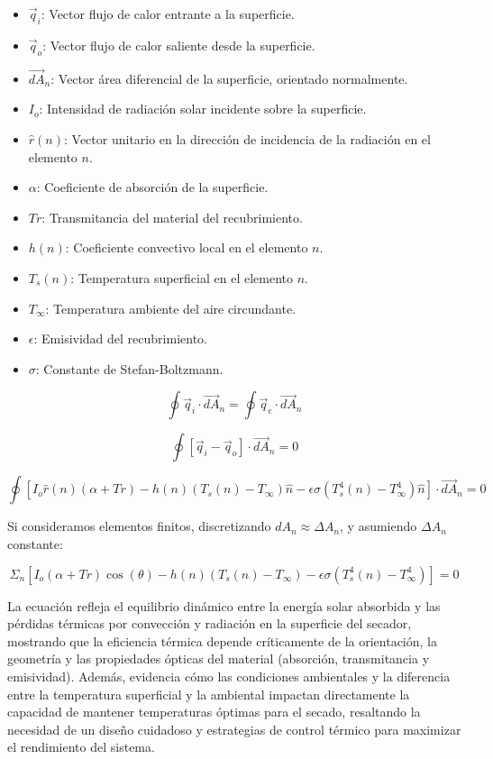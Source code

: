 \documentclass[12pt]{article}
\begin{document}
\begin{itemize}
    \item $\vec{q}_i$: Vector flujo de calor entrante a la superficie.
    \item $\vec{q}_o$: Vector flujo de calor saliente desde la superficie.
    \item $\vec{dA}_n$: Vector área diferencial de la superficie, orientado normalmente.
    \item $I_o$: Intensidad de radiación solar incidente sobre la superficie.
    \item $\hat{r}(n)$: Vector unitario en la dirección de incidencia de la radiación en el elemento $n$.
    \item $\alpha$: Coeficiente de absorción de la superficie.
    \item $Tr$: Transmitancia del material del recubrimiento.
    \item $h(n)$: Coeficiente convectivo local en el elemento $n$.
    \item $T_s(n)$: Temperatura superficial en el elemento $n$.
    \item $T_\infty$: Temperatura ambiente del aire circundante.
    \item $\epsilon$: Emisividad del recubrimiento.
    \item $\sigma$: Constante de Stefan-Boltzmann.
\end{itemize}




$$\oint \vec{q}_i\cdot \vec{dA}_n = \oint \vec{q}_e\cdot\vec{dA}_n$$

$$\oint[\vec{q}_i-\vec{q}_o]\cdot\vec{dA}_n = 0$$

$$\oint[I_o\hat{r}(n)(\alpha+Tr)-h(n)(T_s(n)-T_\infty)\hat{n}-\epsilon\sigma(T_s^4(n)-T_\infty^4)\hat{n}]\cdot\vec{dA}_n = 0$$

Si consideramos elementos finitos, discretizando $dA_n \approx \Delta A_n$, y asumiendo $\Delta A_n$ constante:

$$\Sigma_n [I_o(\alpha+Tr)\cos(\theta)-h(n)(T_s(n)-T_\infty)-\epsilon\sigma(T_s^4(n)-T_\infty^4)] = 0$$

La ecuación refleja el equilibrio dinámico entre la energía solar absorbida y las pérdidas térmicas por convección y radiación en la superficie del secador, mostrando que la eficiencia térmica depende críticamente de la orientación, la geometría y las propiedades ópticas del material (absorción, transmitancia y emisividad). Además, evidencia cómo las condiciones ambientales y la diferencia entre la temperatura superficial y la ambiental impactan directamente la capacidad de mantener temperaturas óptimas para el secado, resaltando la necesidad de un diseño cuidadoso y estrategias de control térmico para maximizar el rendimiento del sistema.
\end{document}
